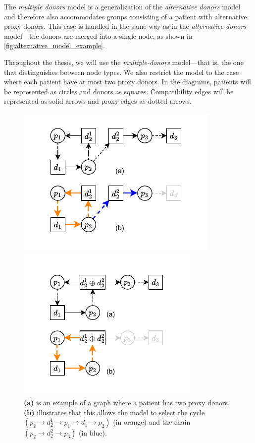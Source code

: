 The \textit{multiple donors} model is a generalization of the \textit{alternative donors} model and therefore also accommodates groups consisting of a patient with alternative proxy donors. This case is handled in the same way as in the \textit{alternative donors} model—the donors are merged into a single node, as shown in \autoref{fig:alternative_model_example}.

Throughout the thesis, we will use the \textit{multiple-donors} model—that is, the one that distinguishes between node types. We also restrict the model to the case where each patient have at most two proxy donors. In the diagrams, patients will be represented as circles and donors as squares. Compatibility edges will be represented as solid arrows and proxy edges as dotted arrows.

\begin{figure}[htbp]
  \centering
  \begin{minipage}[t]{0.48\textwidth}
    \centering
    \includegraphics{data/multiple_model_example.pdf}
    \caption[An example of a graph with a patient having two donors]{\textbf{(a)} is an example of a graph where a patient has two proxy donors. \textbf{(b)} illustrates that this allows the model to select the cycle $(p_2 \rightarrow d_2^1 \rightarrow p_1 \rightarrow d_1 \rightarrow p_2)$ (in orange) and the chain $(p_2 \rightarrow d_2^2 \rightarrow p_3)$ (in blue).}
    \label{fig:multiple_model_example}
  \end{minipage}
  \hfill
  \begin{minipage}[t]{0.48\textwidth}
    \centering
    \includegraphics{data/alternative_model_example.pdf}

\end{minipage}
\end{figure}
